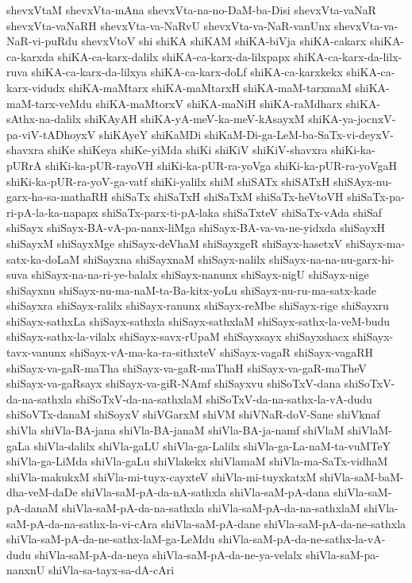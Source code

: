 {shevxVtaM
shevxVta-mAna
shevxVta-na-no-DaM-ba-Disi
shevxVta-vaNaR
shevxVta-vaNaRH
shevxVta-va-NaRvU
shevxVta-va-NaR-vanUnx
shevxVta-va-NaR-vi-puRdu
shevxVtoV
shi
shiKA
shiKAM
shiKA-biVja
shiKA-cakarx
shiKA-ca-karxda
shiKA-ca-karx-dalilx
shiKA-ca-karx-da-lilxpapx
shiKA-ca-karx-da-lilx-ruva
shiKA-ca-karx-da-lilxya
shiKA-ca-karx-doLf
shiKA-ca-karxkekx
shiKA-ca-karx-vidudx
shiKA-maMtarx
shiKA-maMtarxH
shiKA-maM-tarxmaM
shiKA-maM-tarx-veMdu
shiKA-maMtorxV
shiKA-maNiH
shiKA-raMdharx
shiKA-sAthx-na-dalilx
shiKAyAH
shiKA-yA-meV-ka-meV-kAsayxM
shiKA-ya-jocnxV-pa-viV-tADhoyxV
shiKAyeY
shiKaMDi
shiKaM-Di-ga-LeM-ba-SaTx-vi-deyxV-shavxra
shiKe
shiKeya
shiKe-yiMda
shiKi
shiKiV
shiKiV-shavxra
shiKi-ka-pURrA
shiKi-ka-pUR-rayoVH
shiKi-ka-pUR-ra-yoVga
shiKi-ka-pUR-ra-yoVgaH
shiKi-ka-pUR-ra-yoV-ga-vatf
shiKi-yalilx
shiM
shiSATx
shiSATxH
shiSAyx-nu-garx-ha-sa-mathaRH
shiSaTx
shiSaTxH
shiSaTxM
shiSaTx-heVtoVH
shiSaTx-pa-ri-pA-la-ka-napapx
shiSaTx-parx-ti-pA-laka
shiSaTxteV
shiSaTx-vAda
shiSaf
shiSayx
shiSayx-BA-vA-pa-nanx-liMga
shiSayx-BA-va-va-ne-yidxda
shiSayxH
shiSayxM
shiSayxMge
shiSayx-deVhaM
shiSayxgeR
shiSayx-hasetxV
shiSayx-ma-satx-ka-doLaM
shiSayxna
shiSayxnaM
shiSayx-nalilx
shiSayx-na-na-nu-garx-hi-suva
shiSayx-na-na-ri-ye-balalx
shiSayx-nanunx
shiSayx-nigU
shiSayx-nige
shiSayxnu
shiSayx-nu-ma-naM-ta-Ba-kitx-yoLu
shiSayx-nu-ru-ma-satx-kade
shiSayxra
shiSayx-ralilx
shiSayx-ranunx
shiSayx-reMbe
shiSayx-rige
shiSayxru
shiSayx-sathxLa
shiSayx-sathxla
shiSayx-sathxlaM
shiSayx-sathx-la-veM-budu
shiSayx-sathx-la-vilalx
shiSayx-savx-rUpaM
shiSayxsayx
shiSayxshacx
shiSayx-tavx-vanunx
shiSayx-vA-ma-ka-ra-sithxteV
shiSayx-vagaR
shiSayx-vagaRH
shiSayx-va-gaR-maTha
shiSayx-va-gaR-maThaH
shiSayx-va-gaR-maTheV
shiSayx-va-gaRsayx
shiSayx-va-giR-NAmf
shiSayxvu
shiSoTxV-dana
shiSoTxV-da-na-sathxla
shiSoTxV-da-na-sathxlaM
shiSoTxV-da-na-sathx-la-vA-dudu
shiSoVTx-danaM
shiSoyxV
shiVGarxM
shiVM
shiVNaR-doV-Sane
shiVknaf
shiVla
shiVla-BA-jana
shiVla-BA-janaM
shiVla-BA-ja-namf
shiVlaM
shiVlaM-gaLa
shiVla-dalilx
shiVla-gaLU
shiVla-ga-Lalilx
shiVla-ga-La-naM-ta-vuMTeY
shiVla-ga-LiMda
shiVla-gaLu
shiVlakekx
shiVlamaM
shiVla-ma-SaTx-vidhaM
shiVla-makukxM
shiVla-mi-tuyx-cayxteV
shiVla-mi-tuyxkatxM
shiVla-saM-baM-dha-veM-daDe
shiVla-saM-pA-da-nA-sathxla
shiVla-saM-pA-dana
shiVla-saM-pA-danaM
shiVla-saM-pA-da-na-sathxla
shiVla-saM-pA-da-na-sathxlaM
shiVla-saM-pA-da-na-sathx-la-vi-cAra
shiVla-saM-pA-dane
shiVla-saM-pA-da-ne-sathxla
shiVla-saM-pA-da-ne-sathx-laM-ga-LeMdu
shiVla-saM-pA-da-ne-sathx-la-vA-dudu
shiVla-saM-pA-da-neya
shiVla-saM-pA-da-ne-ya-velalx
shiVla-saM-pa-nanxnU
shiVla-sa-tayx-sa-dA-cAri
}
